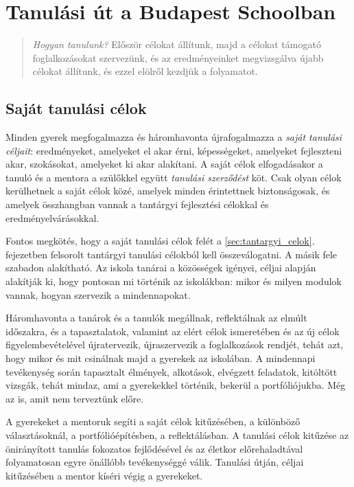 \chapter{Tanulási út a Budapest Schoolban}

\begin{quote}
\emph{Hogyan tanulunk?}
Először célokat állítunk, majd a célokat támogató
foglalkozásokat szervezünk, és az eredményeinket megvizsgálva újabb
célokat állítunk, és ezzel elölről kezdjük a folyamatot.
\end{quote}

\section{Saját tanulási célok}

Minden gyerek megfogalmazza és háromhavonta újrafogalmazza a \emph{saját tanulási céljait}: eredményeket, amelyeket el akar érni, képességeket, amelyeket fejleszteni akar, szokásokat, amelyeket ki akar alakítani. A saját célok elfogadásakor a tanuló és a mentora a szülőkkel együtt \emph{tanulási szerződést} köt. Csak olyan célok kerülhetnek a saját célok közé, amelyek minden érintettnek biztonságosak, és amelyek összhangban vannak a tantárgyi fejlesztési célokkal és eredményelvárásokkal.

Fontos megkötés, hogy a saját tanulási célok felét a \ref{sec:tantargyi_celok}. fejezetben felsorolt tantárgyi tanulási célokból kell összeválogatni. A másik fele szabadon alakítható. Az iskola tanárai a közösségek igényei, céljai alapján alakítják ki, hogy pontosan mi történik az iskolákban: mikor és milyen modulok vannak, hogyan szervezik a mindennapokat.

Háromhavonta a tanárok és a tanulók megállnak, reflektálnak az elmúlt időszakra, és a tapasztalatok, valamint az elért célok ismeretében és az új célok figyelembevételével újratervezik, újraszervezik a foglalkozások rendjét, tehát azt, hogy mikor és mit csinálnak majd a gyerekek az iskolában.
A mindennapi tevékenység során tapasztalt élmények, alkotások, elvégzett feladatok, kitöltött vizsgák, tehát mindaz, ami a gyerekekkel történik, bekerül a portfóliójukba. Még az is, amit nem terveztünk előre.

A gyerekeket a mentoruk segíti a saját célok kitűzésében, a különböző választásoknál, a portfólióépítésben, a reflektálásban. A tanulási célok kitűzése az önirányított tanulás fokozatos fejlődésével és az életkor előrehaladtával folyamatosan egyre önállóbb tevékenységgé válik. Tanulási  útján, céljai kitűzésében a mentor kíséri végig a gyerekeket.


